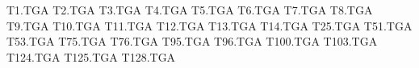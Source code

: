 T1.TGA
T2.TGA
T3.TGA
T4.TGA
T5.TGA
T6.TGA
T7.TGA
T8.TGA
T9.TGA
T10.TGA
T11.TGA
T12.TGA
T13.TGA
T14.TGA
T25.TGA
T51.TGA
T53.TGA
T75.TGA
T76.TGA
T95.TGA
T96.TGA
T100.TGA
T103.TGA
T124.TGA
T125.TGA
T128.TGA